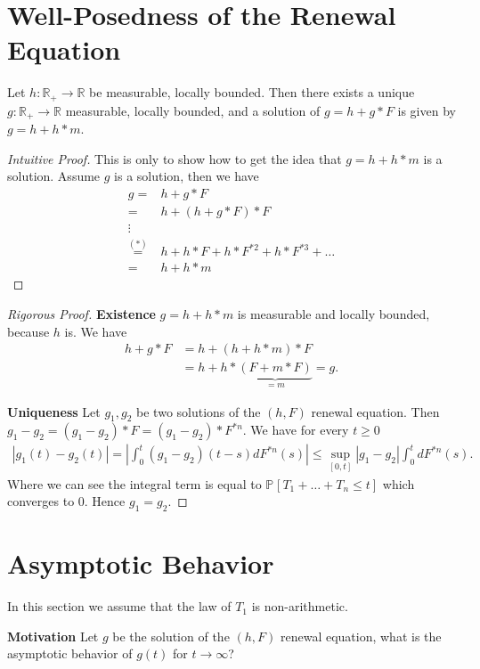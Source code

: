 \section{Well-Posedness of the Renewal Equation}
\begin{theorem}[]
	Let $h: \mathbb{R}_+\to \mathbb{R}$ be measurable, locally bounded. Then there exists a unique $g: \mathbb{R}_+ \to \mathbb{R}$ measurable, locally bounded, and a solution of $g = h + g*F$ is given by $g=h+h*m$. 
\end{theorem}
{\color{blue}
\begin{proof}[Intuitive Proof]
	This is only to show how to get the idea that $g=h+h*m$ is a solution. Assume $g$ is a solution, then we have 
\begin{align}
	g =& h + g*F \\
	=& h + (h+g*F)*F \\
	 \vdots  \\
	\stackrel{(*)}{=}& h + h*F + h*F^{*2} + h*F^{*3}+ \ldots  \\
	=& h + h*m
\end{align}
\end{proof}
}
\begin{proof}[Rigorous Proof]
	\textbf{Existence} 
	$g = h + h*m$ is measurable and locally bounded, because $h$ is. We have 
	\begin{align}
		h + g*F &= h + (h+h*m)*F \\
			&= h + h*\underbrace{(F+m*F)}_{=m}= g.
	\end{align}

\textbf{Uniqueness} 
Let $g_1, g_2$ be two solutions of the $(h,F)$ renewal equation. Then $g_1-g_2 = (g_1 - g_2)*F = (g_1 - g_2) * F^{*n}$. We have for every $t \geq 0$
\begin{align}
	 |g_1(t) - g_2(t)| = \left| \int_{0}^{t} (g_1 - g_2)(t-s)dF^{*n}(s) \right| \leq \sup_{[0,t]} |g_1 - g_2| \int_{0}^{t} dF^{*n}(s).
\end{align}
Where we can see the integral term is equal to $\mathbb{P}_{} \left[ T_1 + \ldots  +T_n \leq t \right] $ which converges to 0. Hence $g_1 = g_2$.
\end{proof}

\section{Asymptotic Behavior}
In this section we assume that the law of $T_1$ is non-arithmetic.

\noindent
\textbf{Motivation} Let $g$ be the solution of the $(h,F)$ renewal equation, what is the asymptotic behavior of $g(t)$ for $t\to \infty$?

